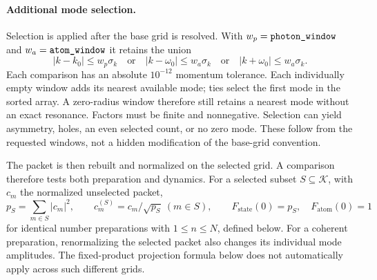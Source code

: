 \documentclass[11pt,a4paper]{article}
\newcommand{\code}[1]{\texttt{\detokenize{#1}}}
\newcommand{\K}{\mathcal K}
\begin{document}
\paragraph{Additional mode selection.}
Selection is applied after the base grid is resolved. With
$w_p=\code{photon_window}$ and $w_a=\code{atom_window}$ it retains the union
\begin{equation}
 |k-k_0|\leq w_p\sigma_k\quad\text{or}\quad
 |k-\omega_0|\leq w_a\sigma_k\quad\text{or}\quad
 |k+\omega_0|\leq w_a\sigma_k.
 \label{eq:selection}
\end{equation}
Each comparison has an absolute $10^{-12}$ momentum tolerance. Each
individually empty window adds its nearest available mode; ties select the
first mode in the sorted array. A zero-radius window therefore still retains
a nearest mode without an exact resonance. Factors must be finite and
nonnegative. Selection can yield asymmetry, holes, an even selected count,
or no zero mode. These follow from the requested windows, not a hidden
modification of the base-grid convention.

The packet is then rebuilt and normalized on the selected grid. A comparison
therefore tests both preparation and dynamics. For a selected subset
$S\subseteq\K$, with $c_m$ the normalized unselected packet,
\begin{equation}
 p_S=\sum_{m\in S}|c_m|^2,\qquad
 c_m^{(S)}=c_m/\sqrt{p_S}\ (m\in S),\qquad
 F_{\mathrm{state}}(0)=p_S,\quad F_{\mathrm{atom}}(0)=1
 \label{eq:selectedprep}
\end{equation}
for identical number preparations with $1\leq n\leq N$, defined below.
For a coherent preparation, renormalizing the selected packet also changes
its individual mode amplitudes. The fixed-product projection formula below
does not automatically apply across such different grids.
\end{document}
